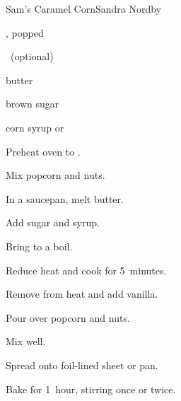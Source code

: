 \begin{recipe}{Sam's Caramel Corn}{Sandra Nordby}{}

\begin{ingredients}
\item {} , popped
\item {} ~(optional)
\item \C{\half} butter
\item {} brown sugar
\item \C{\quarter} corn syrup or 
\item {}
\end{ingredients}

\begin{directions}
\item Preheat oven to .
\item Mix popcorn and nuts.
\item In a saucepan, melt butter.
\item Add sugar and syrup.
\item Bring to a boil.
\item Reduce heat and cook for 5~minutes.
\item Remove from heat and add vanilla.
\item Pour over popcorn and nuts.
\item Mix well.
\item Spread onto foil-lined sheet or pan.
\item Bake for 1~hour, stirring once or twice.
\end{directions}

\end{recipe}
